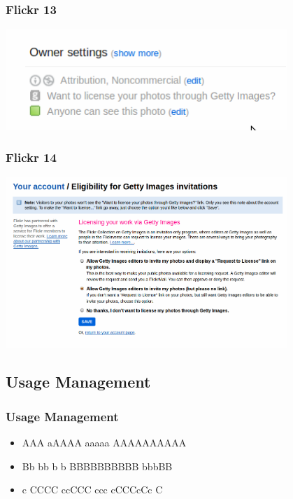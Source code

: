 \documentclass[mathserif,xcolor=dvipsnames,handout]{beamer}
\begin{document}
    \begin{frame}[t]
        \frametitle{Flickr 13}
        \begin{center}
            \includegraphics[width=0.8\textwidth]{want-to-license-your-photos-through-getty-images.png}
        \end{center}
    \end{frame}
    \begin{frame}[t]
        \frametitle{Flickr 14}
        \begin{center}
            \includegraphics[width=0.8\textwidth]{want-to-license-your-photos-through-getty-images2.png}
        \end{center}
    \end{frame}



    \subsection{Usage Management}
    \begin{frame}[t]
        \frametitle{Usage Management}
        \begin{itemize}
            \item<2-> AAA aAAAA aaaaa AAAAAAAAAA
            \item<3-> Bb bb b b BBBBBBBBBB bbbBB
            \item<4-> c CCCC ccCCC ccc cCCCcCc C
        \end{itemize}
    \end{frame}
\end{document}
